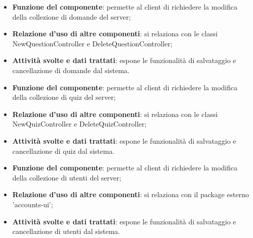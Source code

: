 \begin{itemize}
	\item\textbf{Funzione del componente}: permette al client di richiedere la modifica della collezione di domande del server;
	\item\textbf{Relazione d'uso di altre componenti}: si relaziona con le classi NewQuestionController e DeleteQuestionController;
	\item\textbf{Attività svolte e dati trattati}: espone le funzionalità di salvataggio e cancellazione di domande dal sistema.
\end{itemize}

\begin{itemize}
	\item\textbf{Funzione del componente}: permette al client di richiedere la modifica della collezione di quiz del server;
	\item\textbf{Relazione d'uso di altre componenti}: si relaziona con le classi NewQuizController e DeleteQuizController;
	\item\textbf{Attività svolte e dati trattati}: espone le funzionalità di salvataggio e cancellazione di quiz dal sistema.
\end{itemize}

\begin{itemize}
	\item\textbf{Funzione del componente}: permette al client di richiedere la modifica della collezione di utenti del server;
	\item\textbf{Relazione d'uso di altre componenti}:  si relaziona con il package esterno 'accounts-ui';
	\item\textbf{Attività svolte e dati trattati}: espone le funzionalità di salvataggio e cancellazione di utenti dal sistema.
\end{itemize}
\newpage			

